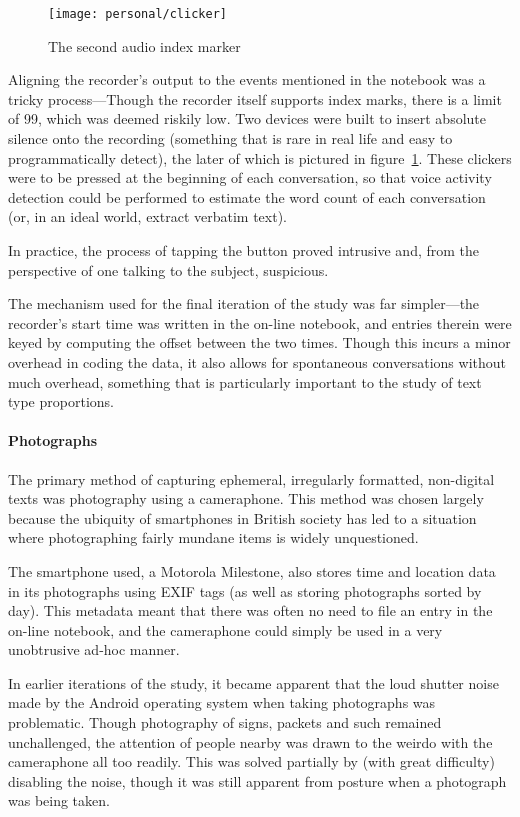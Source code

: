 \begin{figure}[p]
    \centering
    \texttt{[image: personal/clicker]}
    \caption{The second audio index marker}
    \label{fig:personal:clicker}
\end{figure}


Aligning the recorder's output to the events mentioned in the notebook was a tricky process---Though the recorder itself supports index marks, there is a limit of 99, which was deemed riskily low.  Two devices were built to insert absolute silence onto the recording (something that is rare in real life and easy to programmatically detect), the later of which is pictured in figure~\ref{fig:personal:clicker}.  These clickers were to be pressed at the beginning of each conversation, so that voice activity detection could be performed to estimate the word count of each conversation (or, in an ideal world, extract verbatim text).

In practice, the process of tapping the button proved intrusive and, from the perspective of one talking to the subject, suspicious.

The mechanism used for the final iteration of the study was far simpler---the recorder's start time was written in the on-line notebook, and entries therein were keyed by computing the offset between the two times.  Though this incurs a minor overhead in coding the data, it also allows for spontaneous conversations without much overhead, something that is particularly important to the study of text type proportions.



\paragraph{Photographs}
The primary method of capturing ephemeral, irregularly formatted, non-digital texts was photography using a cameraphone.  This method was chosen largely because the ubiquity of smartphones in British society has led to a situation where photographing fairly mundane items is widely unquestioned.

The smartphone used, a Motorola Milestone, also stores time and location data in its photographs using EXIF tags (as well as storing photographs sorted by day).  This metadata meant that there was often no need to file an entry in the on-line notebook, and the cameraphone could simply be used in a very unobtrusive ad-hoc manner.

In earlier iterations of the study, it became apparent that the loud shutter noise made by the Android operating system when taking photographs was problematic.  Though photography of signs, packets and such remained unchallenged, the attention of people nearby was drawn to the weirdo with the cameraphone all too readily.  This was solved partially by (with great difficulty) disabling the noise, though it was still apparent from posture when a photograph was being taken.

